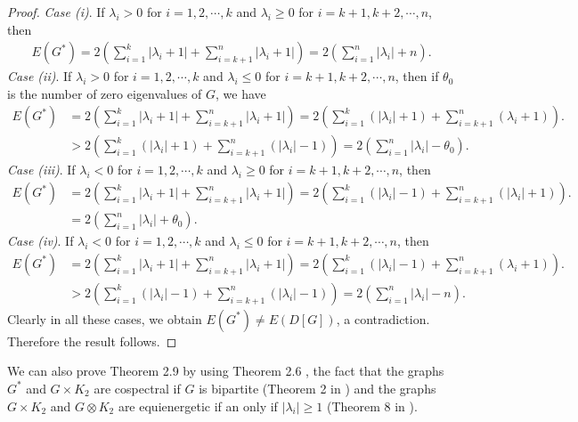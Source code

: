 \documentclass[12pt,a4paper]{amsart}
\theoremstyle{theorem}
\theoremstyle{definition}
\numberwithin{equation}{section} \makeatletter
\begin{document}
\begin{proof}
{\it Case (i)}. If $\lambda_i> 0$ for $ i=1,2,\cdots,k$ and $\lambda_i\geq 0$ for $ i=k+1,k+2,\cdots,n$, then
\begin{align*}
E(G^*)=2\left(\sum\limits_{i=1}^{k}|\lambda_i+1|+\sum\limits_{i=k+1}^{n}|\lambda_i+1| \right)=2\left(\sum\limits_{i=1}^{n}|\lambda_i|+n \right).
\end{align*}
{\it Case (ii)}. If $\lambda_i> 0$ for $ i=1,2,\cdots,k$ and $\lambda_i\leq 0$ for $ i=k+1,k+2,\cdots,n$, then if $\theta_0$ is the number of zero eigenvalues of $G$, we have
\begin{align*}
E(G^*)&=2\left(\sum\limits_{i=1}^{k}|\lambda_i+1|+\sum\limits_{i=k+1}^{n}|\lambda_i+1| \right)=2\left(\sum\limits_{i=1}^{k}(|\lambda_i|+1)+\sum\limits_{i=k+1}^{n}(\lambda_i+1) \right).\\&
> 2\left(\sum\limits_{i=1}^{k}(|\lambda_i|+1)+\sum\limits_{i=k+1}^{n}(|\lambda_i|-1) \right)=2\left(\sum\limits_{i=1}^{n}|\lambda_i|-\theta_0 \right) .
\end{align*}
{\it Case (iii)}. If $\lambda_i< 0$ for $ i=1,2,\cdots,k$ and $\lambda_i\geq 0$ for $ i=k+1,k+2,\cdots,n$, then
\begin{align*}
E(G^*)&=2\left(\sum\limits_{i=1}^{k}|\lambda_i+1|+\sum\limits_{i=k+1}^{n}|\lambda_i+1| \right)=2\left(\sum\limits_{i=1}^{k}(|\lambda_i|-1)+\sum\limits_{i=k+1}^{n}(|\lambda_i|+1) \right).\\&
=2\left(\sum\limits_{i=1}^{n}|\lambda_i|+\theta_0 \right).
\end{align*}
{\it Case (iv)}. If $\lambda_i< 0$ for $ i=1,2,\cdots,k$ and $\lambda_i\leq 0$ for $ i=k+1,k+2,\cdots,n$, then
\begin{align*}
E(G^*)&=2\left(\sum\limits_{i=1}^{k}|\lambda_i+1|+\sum\limits_{i=k+1}^{n}|\lambda_i+1| \right)=2\left(\sum\limits_{i=1}^{k}(|\lambda_i|-1)+\sum\limits_{i=k+1}^{n}(\lambda_i+1) \right).\\&
> 2\left(\sum\limits_{i=1}^{k}(|\lambda_i|-1)+\sum\limits_{i=k+1}^{n}(|\lambda_i|-1) \right)=2\left(\sum\limits_{i=1}^{n}|\lambda_i|-n \right) .
\end{align*}
Clearly in all these cases, we obtain $E(G^*)\neq E(D[G])$, a contradiction. Therefore the result follows.
\end{proof}
\indent We can also prove Theorem 2.9 by using Theorem 2.6 , the fact that the graphs $G^*$ and $G\times K_2$ are cospectral if $G$ is bipartite (Theorem 2 in \cite{c}) and the graphs $G\times K_2$ and $G\otimes K_2$ are equienergetic if an only if $|\lambda_i|\geq 1$ (Theorem 8 in \cite{bva}).
\end{document}
